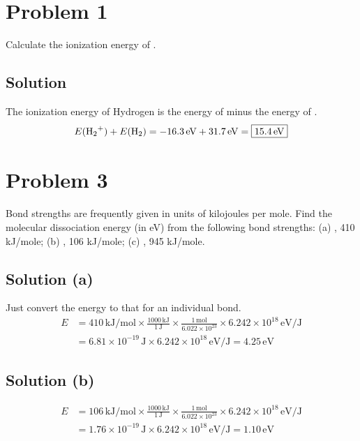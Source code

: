 \documentclass[12pt]{report}
\newcommand{\E}[1]{\times 10^{#1}}
\begin{document}
\section{Problem 1} %
    Calculate the ionization energy of .

    \subsection{Solution}
        The ionization energy of Hydrogen is the energy of  minus the energy of .
        \begin{equation}
            E(\ce{H2+}) + E(\ce{H2}) = -16.3\,\unit{\eV} + 31.7\,\unit{\eV}
                =   \boxed{15.4\,\unit{\eV}}
        \end{equation}

\section{Problem 3} %
    Bond strengths are frequently given in units of kilojoules per mole. 
    Find the molecular dissociation energy (in eV) from the following bond strengths: (a) , 410 kJ/mole; (b) , 106 kJ/mole; (c) , 945 kJ/mole.

    \subsection{Solution (a)}
        Just convert the energy to that for an individual bond.
        \begin{align}
            E   &=  410\,\unit{\kilo\joule/\mole} \times \frac{1000\,\unit{\kilo\joule}}{1\,\unit{\joule}} \times \frac{1\,\unit{\mole}}{6.022\E{23}} \times 6.242\E{18}\,\unit{\eV/\joule}\\
                &=  6.81\E{-19}\,\unit{\joule} \times 6.242\E{18}\,\unit{\eV/\joule}
                =   \boxed{4.25\,\unit{\eV}}
        \end{align}

    \subsection{Solution (b)}
        \begin{align}
            E   &=  106\,\unit{\kilo\joule/\mole} \times \frac{1000\,\unit{\kilo\joule}}{1\,\unit{\joule}} \times \frac{1\,\unit{\mole}}{6.022\E{23}} \times 6.242\E{18}\,\unit{\eV/\joule}\\
                &=  1.76\E{-19}\,\unit{\joule} \times 6.242\E{18}\,\unit{\eV/\joule}
                =   \boxed{1.10\,\unit{\eV}}
        \end{align}
\end{document}
